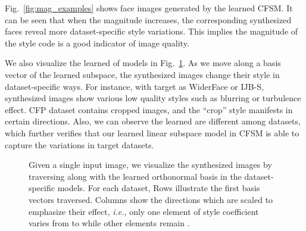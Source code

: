 Fig.~\ref{fig:mag_examples} shows face images generated by the learned CFSM. It can be seen that when the magnitude increases, the corresponding synthesized faces reveal more dataset-specific style variations. This implies the magnitude of the style code is a good  indicator of image quality.

We also visualize the learned  of  models in Fig.~\ref{fig:basis_examples}. As we move along a basis vector of the learned subspace, the synthesized images change their style in dataset-specific ways. For instance, with target as WiderFace or IJB-S, synthesized images show various low quality styles such as blurring or turbulence effect. CFP dataset contains cropped images, and the ``crop'' style manifests in certain directions.  Also, we can observe the learned  are different among datasets, which further verifies that our learned linear subspace model in CFSM is able to capture the variations in target datasets.





\begin{figure}[t]
\footnotesize
{}
\caption{
Given a single input image, we visualize the synthesized images by traversing along with the learned orthonormal basis  in the  dataset-specific models. 
For each dataset, Rows  illustrate the first  basis vectors traversed. 
Columns  show the directions which are scaled to emphasize their effect, {\it i.e.}, only one element of style coefficient  varies from  to  while other  elements remain . }
\label{fig:basis_examples}
\end{figure}
 

